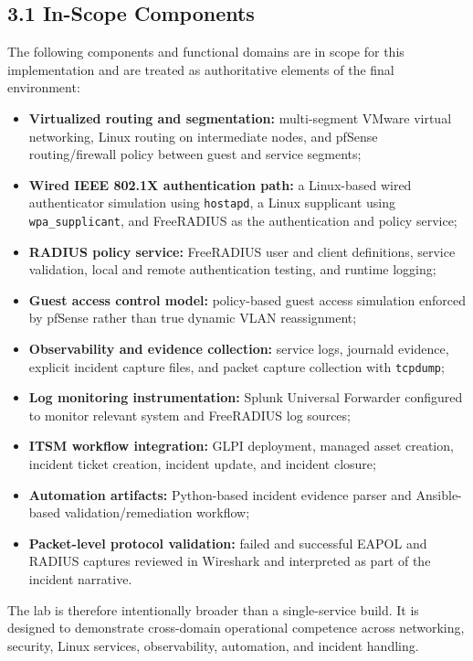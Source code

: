 \documentclass[11pt]{article}
\begin{document}
\subsection{3.1 In-Scope Components}
\label{sec:in-scope-components}

The following components and functional domains are in scope for this implementation and are treated as authoritative elements of the final environment:

\begin{itemize}
    \item \textbf{Virtualized routing and segmentation:} multi-segment VMware virtual networking, Linux routing on intermediate nodes, and pfSense routing/firewall policy between guest and service segments;
    \item \textbf{Wired IEEE 802.1X authentication path:} a Linux-based wired authenticator simulation using \texttt{hostapd}, a Linux supplicant using \texttt{wpa\_supplicant}, and FreeRADIUS as the authentication and policy service;
    \item \textbf{RADIUS policy service:} FreeRADIUS user and client definitions, service validation, local and remote authentication testing, and runtime logging;
    \item \textbf{Guest access control model:} policy-based guest access simulation enforced by pfSense rather than true dynamic VLAN reassignment;
    \item \textbf{Observability and evidence collection:} service logs, journald evidence, explicit incident capture files, and packet capture collection with \texttt{tcpdump};
    \item \textbf{Log monitoring instrumentation:} Splunk Universal Forwarder configured to monitor relevant system and FreeRADIUS log sources;
    \item \textbf{ITSM workflow integration:} GLPI deployment, managed asset creation, incident ticket creation, incident update, and incident closure;
    \item \textbf{Automation artifacts:} Python-based incident evidence parser and Ansible-based validation/remediation workflow;
    \item \textbf{Packet-level protocol validation:} failed and successful EAPOL and RADIUS captures reviewed in Wireshark and interpreted as part of the incident narrative.
\end{itemize}

The lab is therefore intentionally broader than a single-service build. It is designed to demonstrate cross-domain operational competence across networking, security, Linux services, observability, automation, and incident handling.
\end{document}
